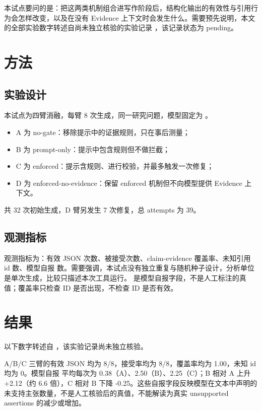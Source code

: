 \documentclass[UTF8]{ctexart}
\begin{document}
本试点要问的是：把这两类机制组合进写作阶段后，结构化输出的有效性与引用行为会怎样改变，以及在没有 Evidence 上下文时会发生什么。需要预先说明，本文的全部实验数字转述自尚未独立核验的实验记录 ，该记录状态为 pending。

\section{方法}

\subsection{实验设计}

本试点为四臂消融，每臂 8 次生成，同一研究问题，模型固定为 。

\begin{itemize}[leftmargin=1.6em]
  \item A 为 no-gate：移除提示中的证据规则，只在事后测量；
  \item B 为 prompt-only：提示中包含规则但不做拦截；
  \item C 为 enforced：提示含规则、进行校验，并最多触发一次修复；
  \item D 为 enforced-no-evidence：保留 enforced 机制但不向模型提供 Evidence 上下文。
\end{itemize}

共 32 次初始生成，D 臂另发生 7 次修复，总 attempts 为 39。

\subsection{观测指标}

观测指标为：有效 JSON 次数、被接受次数、claim-evidence 覆盖率、未知引用 id 数、模型自报  数。需要强调，本试点没有独立重复与随机种子设计，分析单位是单次生成，比较只描述本次工具运行。 是模型自报字段，不是人工标注的真值；覆盖率只检查 ID 是否出现，不检查 ID 是否有效。

\section{结果}

以下数字转述自 ，该实验记录尚未独立核验。

A/B/C 三臂的有效 JSON 均为 8/8，接受率均为 8/8，覆盖率均为 1.00，未知 id 均为 0。模型自报  平均每次为 0.38（A）、2.50（B）、2.25（C）；B 相对 A 上升 +2.12（约 6.6 倍），C 相对 B 下降 -0.25。这些自报字段反映模型在文本中声明的未支持主张数量，不是人工核验后的真值，不能解读为真实 unsupported assertions 的减少或增加。
\end{document}
